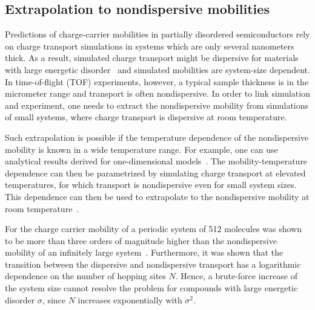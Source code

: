 \subsection{Extrapolation to nondispersive mobilities}
\label{sec:nondispersive}
Predictions of charge-carrier mobilities in partially disordered semiconductors  
rely on charge transport simulations in systems which are only several 
nanometers thick. As a result, simulated charge transport might be dispersive 
for materials with large energetic 
disorder~\cite{scher_anomalous_1975,borsenberger_role_1993} and simulated 
mobilities are system-size dependent. In time-of-flight (TOF) experiments, 
however, a typical sample thickness is in the micrometer range and transport is 
often nondispersive. In order to link simulation and experiment, one needs to 
extract the nondispersive mobility from simulations of small systems, where 
charge transport is dispersive at room temperature.

Such extrapolation is possible if the temperature dependence of the 
nondispersive mobility is known in a wide temperature range. For example, one 
can use analytical results derived for one-dimensional 
models~\cite{derrida_velocity_1983,cordes_one-dimensional_2001,
seki_electric_2001}. The mobility-temperature dependence can then be 
parametrized by simulating charge transport at elevated temperatures, for which 
transport is nondispersive even for small system sizes. This dependence can then 
be used to extrapolate to the nondispersive mobility at room 
temperature~\cite{lukyanov_extracting_2010}.

For the charge carrier mobility of a periodic system of 512 molecules was 
shown to be more than three orders of magnitude higher than the nondispersive 
mobility of an infinitely large system~\cite{lukyanov_extracting_2010}. 
Furthermore, it was shown that the transition between the dispersive and 
nondispersive transport has a logarithmic dependence on the number of hopping 
sites $N$. Hence, a brute-force increase of the system size cannot resolve the 
problem for compounds with large energetic disorder $\sigma$, since $N$ 
increases exponentially with $\sigma^2$.
 

